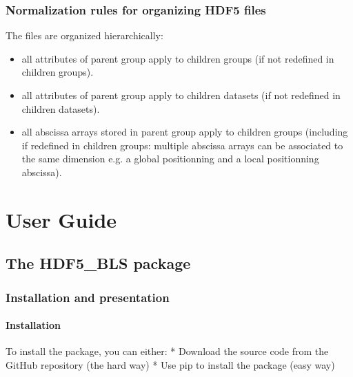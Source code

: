 \documentclass[letterpaper,10pt,english]{sphinxmanual}
\begin{document}
\section{Normalization rules for organizing HDF5 files}
\label{\detokenize{source/normalization:normalization-rules-for-organizing-hdf5-files}}
\sphinxAtStartPar
The files are organized hierarchically:
\begin{itemize}
\item {} 
\sphinxAtStartPar
all attributes of parent group apply to children groups (if not redefined in children groups).

\item {} 
\sphinxAtStartPar
all attributes of parent group apply to children datasets (if not redefined in children datasets).

\item {} 
\sphinxAtStartPar
all abscissa arrays stored in parent group apply to children groups (including if redefined in children groups: multiple abscissa arrays can be associated to the same dimension \sphinxhyphen{} e.g. a global positionning and a local positionning abscissa).

\end{itemize}

\part{User Guide}

\sphinxstepscope


\chapter{The HDF5\_BLS package}
\label{\detokenize{source/hdf5_bls_package:the-hdf5-bls-package}}\label{\detokenize{source/hdf5_bls_package::doc}}

\section{Installation and presentation}
\label{\detokenize{source/hdf5_bls_package:installation-and-presentation}}

\subsection{Installation}
\label{\detokenize{source/hdf5_bls_package:installation}}\label{\detokenize{source/hdf5_bls_package:hdf5-bls-package-installation}}
\sphinxAtStartPar
To install the package, you can either:
* Download the source code from the GitHub repository (the hard way)
* Use pip to install the package (easy way)
\end{document}
